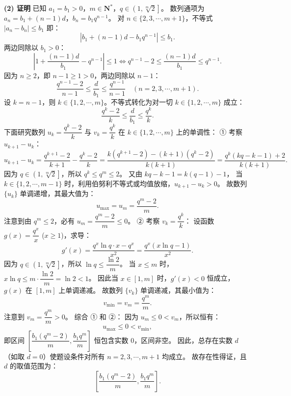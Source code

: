 \begin{answer}
\textbf{(2) 证明}
已知 $a_1 = b_1 > 0$，$m \in \mathbf{N}^*$，$q \in \left(1, \sqrt[m]{2}\right]$。
数列通项为 $a_n = b_1 + (n - 1)d$，$b_n = b_1 q^{n-1}$。
对 $n \in \{2, 3, \cdots, m + 1\}$，不等式 $|a_n - b_n| \leqslant b_1$ 即：
\nopagebreak[4]
\[|b_1 + (n - 1)d - b_1 q^{n-1}| \leqslant b_1.\]
两边同除以 $b_1 > 0$：
\nopagebreak[4]
\[\left|1 + \frac{(n - 1)d}{b_1} - q^{n-1}\right| \leqslant 1 \iff q^{n-1} - 2 \leqslant \frac{(n - 1)d}{b_1} \leqslant q^{n-1}.\]
因为 $n \geqslant 2$，即 $n - 1 \geqslant 1 > 0$，两边同除以 $n - 1$：
\nopagebreak[4]
\[\frac{q^{n-1} - 2}{n - 1} \leqslant \frac{d}{b_1} \leqslant \frac{q^{n-1}}{n - 1}\quad (n = 2, 3, \cdots, m + 1).\]
设 $k = n - 1$，则 $k \in \{1, 2, \cdots, m\}$。不等式转化为对一切 $k \in \{1, 2, \cdots, m\}$ 成立：
\nopagebreak[4]
\[\frac{q^k - 2}{k} \leqslant \frac{d}{b_1} \leqslant \frac{q^k}{k}.\]
下面研究数列 $u_k = \dfrac{q^k - 2}{k}$ 与 $v_k = \dfrac{q^k}{k}$ 在 $k \in \{1, 2, \cdots, m\}$ 上的单调性：
① 考察 $u_{k+1} - u_k$：
\nopagebreak[4]
\[u_{k+1} - u_k = \frac{q^{k+1} - 2}{k + 1} - \frac{q^k - 2}{k} = \frac{k(q^{k+1} - 2) - (k + 1)(q^k - 2)}{k(k + 1)} = \frac{q^k(kq - k - 1) + 2}{k(k + 1)}.\]
因为 $q \in \left(1, \sqrt[m]{2}\right]$，所以 $q^k \leqslant q^m \leqslant 2$。
又由 $kq - k - 1 = k(q - 1) - 1$，
当 $k \in \{1, 2, \cdots, m - 1\}$ 时，利用伯努利不等式或均值放缩，$u_{k+1} - u_k > 0$。
故数列 $\{u_k\}$ 单调递增，其最大值为：
\nopagebreak[4]
\[u_{\max} = u_m = \frac{q^m - 2}{m}.\]
注意到由 $q^m \leqslant 2$，必有 $u_m = \dfrac{q^m - 2}{m} \leqslant 0$。
② 考察 $v_k = \dfrac{q^k}{k}$：
设函数 $g(x) = \dfrac{q^x}{x}$ ($x \geqslant 1$)，求导：
\nopagebreak[4]
\[g'(x) = \frac{q^x \ln q \cdot x - q^x}{x^2} = \frac{q^x(x\ln q - 1)}{x^2}.\]
因为 $q \in \left(1, \sqrt[m]{2}\right]$，所以 $\ln q \leqslant \dfrac{\ln 2}{m}$。
当 $x \leqslant m$ 时，$x\ln q \leqslant m \cdot \dfrac{\ln 2}{m} = \ln 2 < 1$。
因此当 $x \in [1, m]$ 时，$g'(x) < 0$ 恒成立，$g(x)$ 在 $[1, m]$ 上单调递减。
故数列 $\{v_k\}$ 单调递减，其最小值为：
\nopagebreak[4]
\[v_{\min} = v_m = \frac{q^m}{m}.\]
注意到 $v_m = \dfrac{q^m}{m} > 0$。
综合 ① 和 ②：
因为 $u_m \leqslant 0 < v_m$，所以恒有：
\nopagebreak[4]
\[u_{\max} \leqslant 0 < v_{\min},\]
即区间 $\left[\dfrac{b_1(q^m - 2)}{m}, \dfrac{b_1 q^m}{m}\right]$ 恒包含实数 0，区间非空。
因此，总存在实数 $d$（如取 $d = 0$）使题设条件对所有 $n = 2, 3, \cdots, m + 1$ 均成立。
故存在性得证，且 $d$ 的取值范围为：
\nopagebreak[4]
\[\left[\frac{b_1(q^m - 2)}{m}, \frac{b_1 q^m}{m}\right].\]



\end{answer}
